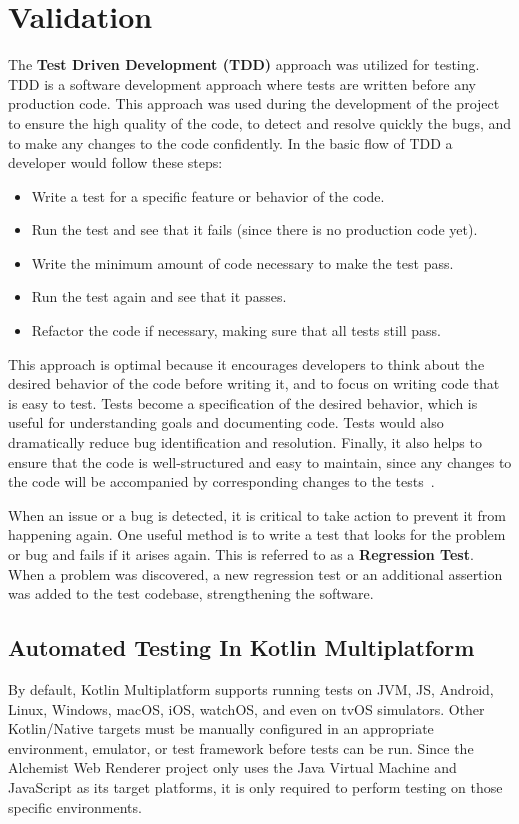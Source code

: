 \chapter{Validation}
\label{chap:validation}
The \textbf{Test Driven Development (TDD)} approach was utilized for testing. TDD is a software development approach where tests are written before any production code. This approach was used during the development of the project to ensure the high quality of the code, to detect and resolve quickly the bugs, and to make any changes to the code confidently. In the basic flow of TDD a developer would follow these steps:
\begin{itemize}
	\item Write a test for a specific feature or behavior of the code.
	\item Run the test and see that it fails (since there is no production code yet).
	\item Write the minimum amount of code necessary to make the test pass.
	\item Run the test again and see that it passes.
	\item Refactor the code if necessary, making sure that all tests still pass.
\end{itemize}
This approach is optimal because it encourages developers to think about the desired behavior of the code before writing it, and to focus on writing code that is easy to test.
Tests become a specification of the desired behavior, which is useful for understanding goals and documenting code.
Tests would also dramatically reduce bug identification and resolution.
Finally, it also helps to ensure that the code is well-structured and easy to maintain, since any changes to the code will be accompanied by corresponding changes to the tests~\cite{slides-software-quality}.\newline

When an issue or a bug is detected, it is critical to take action to prevent it from happening again. One useful method is to write a test that looks for the problem or bug and fails if it arises again. This is referred to as a \textbf{Regression Test}. When a problem was discovered, a new regression test or an additional assertion was added to the test codebase, strengthening the software.

\section{Automated Testing In Kotlin Multiplatform}
\label{sec:automated-testing-in-kotlin-multiplatform}
By default, Kotlin Multiplatform supports running tests on JVM, JS, Android, Linux, Windows, macOS, iOS, watchOS, and even on tvOS simulators. Other Kotlin/Native targets must be manually configured in an appropriate environment, emulator, or test framework before tests can be run. Since the Alchemist Web Renderer project only uses the Java Virtual Machine and JavaScript as its target platforms, it is only required to perform testing on those specific environments.\newline

